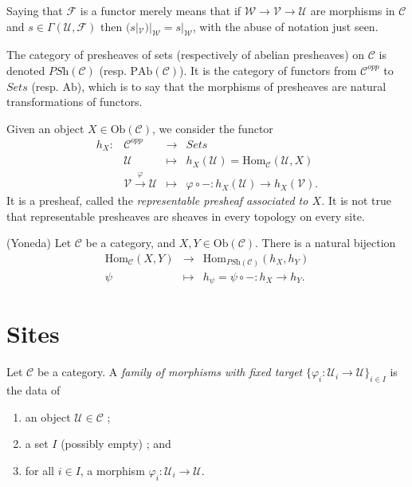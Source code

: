 \medskip\noindent
Saying that $\mathcal{F}$ is a functor merely means that if $\mathcal{W} \to 
\mathcal{V} \to \mathcal{U}$ are morphisms in $\mathcal{C}$ and $s \in 
\Gamma(\mathcal{U},\mathcal{F})$ then
$(s|_\mathcal{V})|_\mathcal{W} = s |_\mathcal{W}$, with the abuse of
notation just seen.

\medskip\noindent
The category of presheaves of sets (respectively of abelian presheaves) on 
$\mathcal{C}$ is denoted $\textit{PSh} (\mathcal{C})$ (resp. $\text{PAb} 
(\mathcal{C})$). It is the category of functors from $\mathcal{C}^{opp}$ to 
$\textit{Sets}$ (resp. $\text{Ab}$), which is to say that the morphisms of 
presheaves are natural transformations of functors. 

\begin{example}
\label{example-representable-presheaf}
Given an object $X \in \text{Ob}(\mathcal{C})$, we consider the functor
$$
\begin{matrix}
h_X : & \mathcal{C}^{opp} & \to & \textit{Sets} \\
& \mathcal{U} & \mapsto & h_X(\mathcal{U}) = \text{Hom}_\mathcal{C} 
(\mathcal{U},X) \\
& \mathcal{V}\xrightarrow{\varphi} \mathcal{U} & \mapsto &
\varphi \circ  - : 
h_X(\mathcal{U})
\to
h_X(\mathcal{V}).
\end{matrix}
$$
It is a presheaf, called the {\it representable presheaf associated to $X$.} 
It is not true that representable presheaves are sheaves in every topology on 
every site.
\end{example}

\begin{lemma}
\label{lemma-yoneda}
(Yoneda)
Let $\mathcal{C}$ be a category, and $X,Y \in 
\text{Ob}(\mathcal{C})$. There is a natural bijection 
$$
\begin{matrix}
\text{Hom}_\mathcal{C}(X,Y) &
\longrightarrow &
\text{Hom}_{\textit{PSh}(\mathcal{C})} (h_X,h_Y) \\
\psi &
\longmapsto &
h_\psi =  \psi \circ - : h_X \to h_Y.
\end{matrix}
$$
\end{lemma}





\section{Sites}
\label{section-sites}

\begin{definition}
\label{definition-family-morphisms-fixed-target}
Let $\mathcal{C}$ be a category. A {\it family of morphisms with fixed target} 
$\{\varphi_i : \mathcal{U}_i \to \mathcal{U} \}_{i\in I}$ is the data of
\begin{enumerate}
\item an object $\mathcal{U} \in \mathcal{C}$ ; 
\item a set $I$ (possibly empty) ; and 
\item for all $i\in I$, a morphism $\varphi_i : \mathcal{U}_i \to \mathcal{U}$. 
\end{enumerate}
\end{definition}

